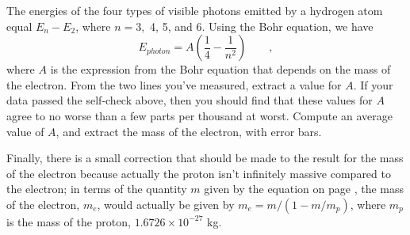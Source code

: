 The energies of the four types of visible photons emitted by
a hydrogen atom equal $E_n-E_2$, where $n=3,$ 4, 5, and 6.
Using the Bohr equation, we have
\begin{equation*}
  E_{photon} = A\left(\frac{1}{4}-\frac{1}{n^2}\right) \qquad ,
\end{equation*}
where $A$ is the expression from the Bohr equation that depends
on the mass of the electron. From the two lines you've measured,
extract a value for $A$. If your data passed the self-check above, then
you should find that these values for $A$ agree
to no worse than a few parts per thousand at worst.
Compute an average value of $A$, and extract the mass of the electron,
with error bars.

Finally, there is a small correction that should be made to the result
for the mass of the electron because actually the proton isn't infinitely
massive compared to the electron; in terms of the quantity $m$ given by the
equation on page \pageref{bohr-equation}, the mass of the electron, $m_e$, would
actually be given by $m_e=m/(1-m/m_p)$, where $m_p$ is the mass of the proton,
$1.6726\times10^{-27}$ kg.

